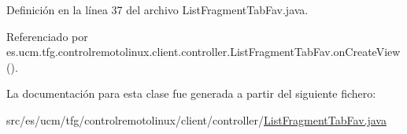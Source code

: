 Definición en la línea 37 del archivo List\-Fragment\-Tab\-Fav.\-java.



Referenciado por es.\-ucm.\-tfg.\-controlremotolinux.\-client.\-controller.\-List\-Fragment\-Tab\-Fav.\-on\-Create\-View().



La documentación para esta clase fue generada a partir del siguiente fichero\-:\begin{DoxyCompactItemize}
\item 
src/es/ucm/tfg/controlremotolinux/client/controller/\hyperlink{ListFragmentTabFav_8java}{List\-Fragment\-Tab\-Fav.\-java}\end{DoxyCompactItemize}
